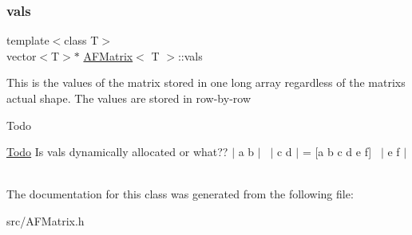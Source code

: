 \subsubsection{\texorpdfstring{vals}{vals}}
{\footnotesize\ttfamily template$<$class T$>$ \\
vector$<$T$>$$\ast$ \hyperlink{classAFMatrix}{A\+F\+Matrix}$<$ T $>$\+::vals}

This is the values of the matrix stored in one long array regardless of the matrix\textquotesingle{}s actual shape. The values are stored in row-\/by-\/row

\begin{DoxyRefDesc}{Todo}
\item[\hyperlink{todo__todo000001}{Todo}]Is vals dynamically allocated or what?? $\vert$ a b $\vert$~\newline
$\vert$ c d $\vert$ = \mbox{[}a b c d e f\mbox{]}~\newline
$\vert$ e f $\vert$~\newline
\end{DoxyRefDesc}


The documentation for this class was generated from the following file\+:\begin{DoxyCompactItemize}
\item 
src/A\+F\+Matrix.\+h\end{DoxyCompactItemize}
